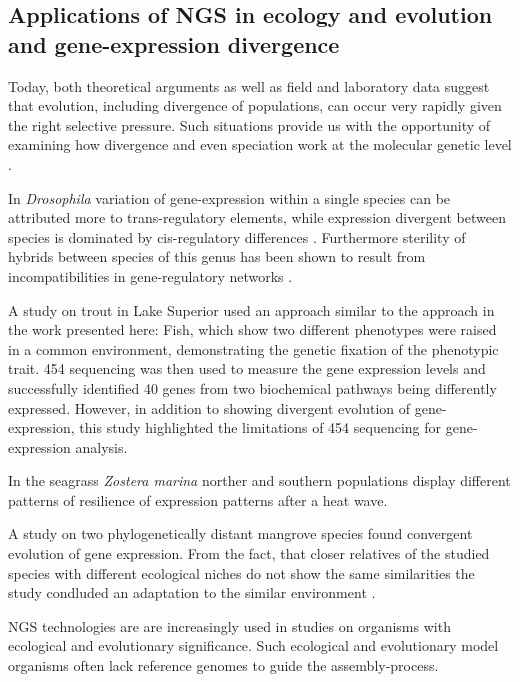\subsection{Applications of NGS in ecology and evolution and
  gene-expression divergence}

\label{sec:appl-ngs}

Today, both theoretical arguments as well as field and laboratory data
suggest that evolution, including divergence of populations, can occur
very rapidly given the right selective pressure. Such situations
provide us with the opportunity of examining how divergence and even
speciation work at the molecular genetic level
\cite{via_ecological_2002}.

In \textit{Drosophila} variation of gene-expression within a single
species can be attributed more to trans-regulatory elements, while
expression divergent between species is dominated by cis-regulatory
differences \cite{pmid20354124}. Furthermore sterility of hybrids
between species of this genus has been shown to result from
incompatibilities in gene-regulatory networks \cite{pmid16757655}.

A study on trout in Lake Superior \cite{pmid20331779} used an approach
similar to the approach in the work presented here: Fish, which show
two different phenotypes were raised in a common environment,
demonstrating the genetic fixation of the phenotypic trait. 454
sequencing was then used to measure the gene expression levels and
successfully identified 40 genes from two biochemical pathways being
differently expressed. However, in addition to showing divergent
evolution of gene-expression, this study highlighted the limitations
of 454 sequencing for gene-expression analysis.

In the seagrass \textit{Zostera marina} norther and southern
populations display different patterns of resilience of expression
patterns after a heat wave.

A study on two phylogenetically distant mangrove species found
convergent evolution of gene expression. From the fact, that closer
relatives of the studied species with different ecological niches do
not show the same similarities the study condluded an adaptation to
the similar environment \cite{dassanayake2009shedding}.


NGS technologies are are increasingly used in studies on organisms
with ecological and evolutionary significance. Such ecological and
evolutionary model organisms often lack reference genomes to guide the
assembly-process.



